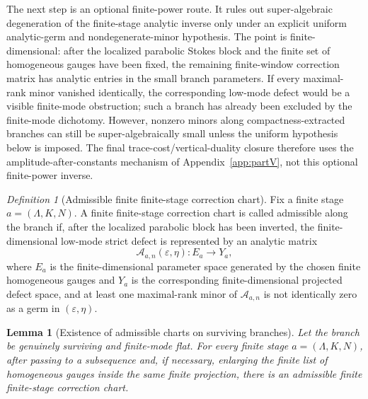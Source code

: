 \documentclass[11pt]{article}
\numberwithin{equation}{section}
\theoremstyle{plain}
\newtheorem{lemma}{Lemma}[section]
\theoremstyle{definition}
\theoremstyle{remark}
\newtheorem{definition}{Definition}[section]
\begin{document}
The next step is an optional finite-power route.  It rules out super-algebraic degeneration of the finite-stage analytic inverse only under an explicit uniform analytic-germ and nondegenerate-minor hypothesis.  The point is finite-dimensional: after the localized parabolic Stokes block and the finite set of homogeneous gauges have been fixed, the remaining finite-window correction matrix has analytic entries in the small branch parameters.  If every maximal-rank minor vanished identically, the corresponding low-mode defect would be a visible finite-mode obstruction; such a branch has already been excluded by the finite-mode dichotomy.  However, nonzero minors along compactness-extracted branches can still be super-algebraically small unless the uniform hypothesis below is imposed.  The final trace-cost/vertical-duality closure therefore uses the amplitude-after-constants mechanism of Appendix~\ref{app:partV}, not this optional finite-power inverse.

\begin{definition}[Admissible finite finite-stage correction chart]
\label{pIV:def:admissible-newton-chart}
Fix a finite stage \(a=(\Lambda,K,N)\). A finite finite-stage correction chart is called admissible
along the branch if, after the localized parabolic block has been inverted, the
finite-dimensional low-mode strict defect is represented by an analytic matrix
\[
        \mathcal A_{a,n}(\varepsilon,\eta):E_a\to Y_a,
\]
where \(E_a\) is the finite-dimensional parameter space generated by the chosen
finite homogeneous gauges and \(Y_a\) is the corresponding finite-dimensional
projected defect space, and at least one maximal-rank minor of
\(\mathcal A_{a,n}\) is not identically zero as a germ in \((\varepsilon,\eta)\).
\end{definition}

\begin{lemma}[Existence of admissible charts on surviving branches]
\label{pIV:lem:admissible-chart-existence}
Let the branch be genuinely surviving and finite-mode flat. For every finite stage
\(a=(\Lambda,K,N)\), after passing to a subsequence and, if necessary, enlarging the
finite list of homogeneous gauges inside the same finite projection, there is an
admissible finite finite-stage correction chart.
\end{lemma}
\end{document}

